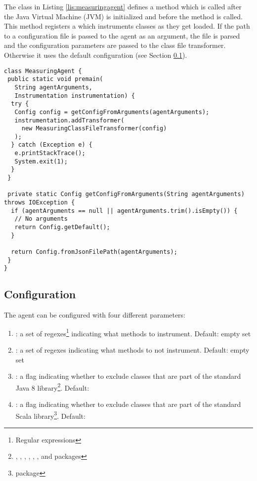 \noindent The  class in Listing \ref{lis:measuringagent} defines a  method which is called after the Java Virtual Machine (JVM) is initialized and before the  method is called. This method registers a  which instruments classes as they get loaded. If the path to a configuration file is passed to the agent as an argument, the file is parsed and the configuration parameters are passed to the class file transformer. Otherwise it uses the default configuration (see Section \ref{sec:implementation:agent:configuration}).

\noindent\begin{minipage}[c]{\linewidth}
\begin{lstlisting}[breaklines,caption={$MeasuringAgent$ class},label=lis:measuringagent]
class MeasuringAgent {
 public static void premain(
   String agentArguments,
   Instrumentation instrumentation) {
  try {
   Config config = getConfigFromArguments(agentArguments);
   instrumentation.addTransformer(
     new MeasuringClassFileTransformer(config)
   );
  } catch (Exception e) {
   e.printStackTrace();
   System.exit(1);
  }
 }

 private static Config getConfigFromArguments(String agentArguments) throws IOException {
  if (agentArguments == null || agentArguments.trim().isEmpty()) {
   // No arguments
   return Config.getDefault();
  }

  return Config.fromJsonFilePath(agentArguments);
 }
}
\end{lstlisting}
\end{minipage}

\subsection{Configuration}
\label{sec:implementation:agent:configuration}
The agent can be configured with four different parameters:
\begin{enumerate}
  \item \textbf{}: a set of regexes\footnote{Regular expressions} indicating what methods to instrument. Default: empty set
  \item \textbf{}: a set of regexes indicating what methods to not instrument. Default: empty set
  \item \textbf{}: a flag indicating whether to exclude classes that are part of the standard Java 8 library\footnote{, , , , , ,  and  packages}. Default: 
  \item \textbf{}:  a flag indicating whether to exclude classes that are part of the standard Scala library\footnote{ package}. Default: 
\end{enumerate}

